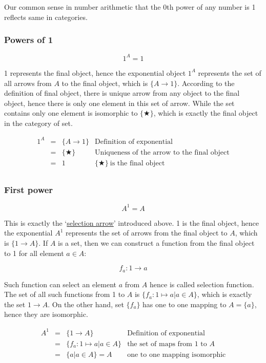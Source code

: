 \documentclass{article}
\begin{document}
Our common sense in number arithmetic that the 0th power of any number is 1 reflects same in categories.

\subsubsection{Powers of 1}

\[
  1^A = 1
\]

1 represents the final object, hence the exponential object $1^A$ represents the set of all arrows from $A$ to the final object, which is $\{ A \to 1 \}$. According to the definition of final object, there is unique arrow from any object to the final object, hence there is only one element in this set of arrow. While the set contains only one element is isomorphic to $\{ \bigstar \}$, which is exactly the final object in the category of set.

\[
\begin{array}{rcll}
1^A & = & \{ A \to 1 \} & \text{Definition of exponential} \\
    & = & \{ \bigstar \} & \text{Uniqueness of the arrow to the final object} \\
    & = & 1 & \{ \bigstar \}\ \text{is the final object} \\
\end{array}
\]

\subsubsection{First power}

\[
  A^1 = A
\]

This is exactly the `\hyperref[sec:selection-arrow]{selection arrow}' introduced above. 1 is the final object, hence the exponential $A^1$ represents the set of arrows from the final object to $A$, which is $\{ 1 \to A\}$. If $A$ is a set, then we can construct a function from the final object to 1 for all element $a \in A$:

\[
  f_a : 1 \to a
\]

Such function can select an element $a$ from $A$ hence is called selection function. The set of all such functions from 1 to $A$ is $\{f_a : 1 \mapsto a | a \in A\}$, which is exactly the set $1 \to A$. On the other hand, set $\{ f_a \}$ has one to one mapping to $A = \{a\}$, hence they are isomorphic.

\[
\begin{array}{rcll}
A^1 & = & \{ 1 \to A \} & \text{Definition of exponential} \\
    & = & \{ f_a : 1 \mapsto a | a \in A \} & \text{the set of maps from 1 to $A$} \\
    & = & \{ a | a \in A \} = A & \text{one to one mapping isomorphic} \\
\end{array}
\]
\end{document}
